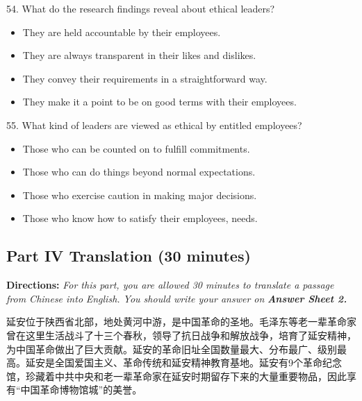 \documentclass[UTF8,11pt]{ctexart}
\begin{document}
54. What do the research findings reveal about ethical leaders?


\begin{itemize}[leftmargin=2em,itemsep=.2em,topsep=.4em]\item[A.] They are held accountable by their employees.
\item[B.] They are always transparent in their likes and dislikes.
\end{itemize}

\begin{itemize}[leftmargin=2em,itemsep=.2em,topsep=.4em]\item[C.] They convey their requirements in a straightforward way.
\item[D.] They make it a point to be on good terms with their employees.
\end{itemize}

55. What kind of leaders are viewed as ethical by entitled employees?


\begin{itemize}[leftmargin=2em,itemsep=.2em,topsep=.4em]\item[A.] Those who can be counted on to fulfill commitments.
\item[B.] Those who can do things beyond normal expectations.
\item[C.] Those who exercise caution in making major decisions.
\item[D.] Those who know how to satisfy their employees, needs.
\end{itemize}

\subsection*{\textbf{Part IV} \textbf{Translation} \textbf{(30 minutes)}}


\textbf{Directions: }\textit{For this part, you are allowed 30 minutes to translate a passage from Chinese into} \textit{English. You should write your answer on }\textbf{\textit{Answer Sheet 2.}}


延安位于陕西省北部，地处黄河中游，是中国革命的圣地。毛泽东等老一辈革命家曾在这里生活战斗了十三个春秋，领导了抗日战争和解放战争，培育了延安精神，为中国革命做出了巨大贡献。延安的革命旧址全国数量最大、分布最广、级别最高。延安是全国爱国主义、革命传统和延安精神教育基地。延安有9个革命纪念馆，珍藏着中共中央和老一辈革命家在延安时期留存下来的大量重要物品，因此享有“中国革命博物馆城”的美誉。
\end{document}
